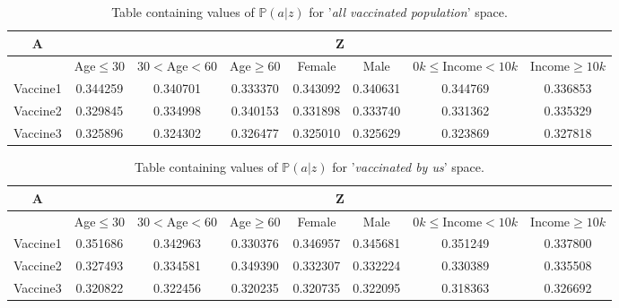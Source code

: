 \documentclass{article}
\begin{document}
\begin{center}
\begin{table}[H]
\begin{adjustbox}{max width=\textwidth}
\begin{tabular}{ |c| c c c c c c c| }
\hline
A  & \multicolumn{7}{c|}{Z} \\
\hline
  & Age$\leq30$ &    $30<$Age$<60$ &     Age$\geq60$ &    Female &      Male &   $0k\leq$Income$<10k$ &    Income$\geq10k$ \\
\hline
 Vaccine1 & 0.344259 &  0.340701 &  0.333370 &  0.343092 &  0.340631 &  0.344769 &  0.336853 \\ 
 Vaccine2 &  0.329845 &  0.334998 &  0.340153 &  0.331898 &  0.333740 &  0.331362 &  0.335329 \\  
 Vaccine3 & 0.325896 &  0.324302 &  0.326477 &  0.325010 &  0.325629 &  0.323869 &  0.327818  
 \\ \hline
\end{tabular}
\end{adjustbox}
\caption{Table containing values of $\mathbb{P}(a|z)$ for '\textit{all vaccinated population}' space.}
\label{tab:1}
\end{table}
\end{center}


\begin{center}
\begin{table}[H]
\begin{adjustbox}{max width=\textwidth}
\begin{tabular}{ |c| c c c c c c c|}
\hline
A  & \multicolumn{7}{c|}{Z} \\
\hline
  & Age$\leq30$ &    $30<$Age$<60$ &     Age$\geq60$ &    Female &      Male &   $0k\leq$Income$<10k$ &    Income$\geq10k$ \\
\hline
 Vaccine1 &  0.351686 &  0.342963 &  0.330376 &  0.346957 &  0.345681 &  0.351249 &  0.337800 \\
 Vaccine2 & 0.327493 &  0.334581 &  0.349390 &  0.332307 &  0.332224 &  0.330389 &  0.335508 \\  
 Vaccine3 &  0.320822 &  0.322456 &  0.320235 &  0.320735 &  0.322095 &  0.318363 &  0.326692  
  \\ \hline
\end{tabular}
\end{adjustbox}
\caption{Table containing values of $\mathbb{P}(a|z)$ for '\textit{vaccinated by us}' space.}
\label{tab:2}
\end{table}
\end{center}
\end{document}
